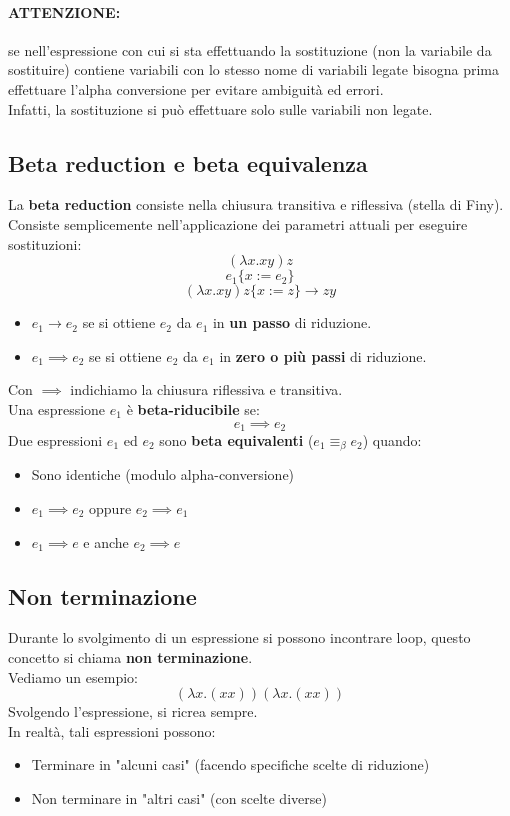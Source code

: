 \documentclass[12pt,a4paper]{article}
\begin{document}
\paragraph{ATTENZIONE:} se nell'espressione con cui si sta effettuando la sostituzione (non la variabile da sostituire) contiene variabili con lo stesso nome di variabili legate bisogna prima effettuare l'alpha conversione per evitare ambiguità ed errori.\\
Infatti, la sostituzione si può effettuare solo sulle variabili non legate.

\subsection{Beta reduction e beta equivalenza}
La \textbf{beta reduction} consiste nella chiusura transitiva e riflessiva (stella di Finy).\\
Consiste semplicemente nell'applicazione dei parametri attuali per eseguire sostituzioni:
\[
(\lambda x.xy)z
\]
\[
e_1 \{x := e_2\}
\]
\[
(\lambda x.xy)z \{x := z\} \rightarrow zy
\]
\begin{itemize}
  \item $e_1 \rightarrow e_2$ se si ottiene $e_2$ da $e_1$ in \textbf{un passo} di riduzione.
  \item $e_1 \implies e_2$ se si ottiene $e_2$ da $e_1$ in \textbf{zero o più passi} di riduzione. 
\end{itemize}
Con $\implies$ indichiamo la chiusura riflessiva e transitiva.\\
Una espressione $e_1$ è \textbf{beta-riducibile} se:
\[
e_1 \implies e_2
\]
Due espressioni $e_1$ ed $e_2$ sono \textbf{beta equivalenti} ($e_1 \equiv_\beta e_2$) quando:
\begin{itemize}
  \item Sono identiche (modulo alpha-conversione)
  \item $e_1 \implies e_2$ oppure $e_2 \implies e_1$
  \item $e_1 \implies e$ e anche $e_2 \implies e$
\end{itemize} 

\subsection{Non terminazione}
Durante lo svolgimento di un espressione si possono incontrare loop, questo concetto si chiama \textbf{non terminazione}.\\
Vediamo un esempio:
\[
(\lambda x.(xx))(\lambda x.(xx))
\]
Svolgendo l'espressione, si ricrea sempre.\\
In realtà, tali espressioni possono:
\begin{itemize}
  \item Terminare in "alcuni casi" (facendo specifiche scelte di riduzione)
  \item Non terminare in "altri casi" (con scelte diverse)
\end{itemize}
\end{document}
